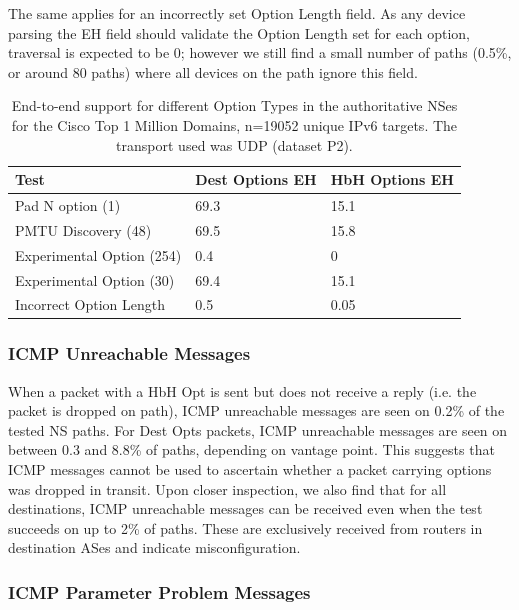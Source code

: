 \documentclass[conference]{IEEEtran}
\begin{document}
The same applies for an incorrectly set Option Length field. As any device parsing the EH field should validate the Option Length set for each option, traversal is expected to be 0; however we still find a small number of paths (0.5\%, or around 80 paths) where all devices on the path ignore this field.

\begin{table}
\begin{tabular}{l|l|l}
Test                      & Dest Options EH & HbH Options EH \\
\hline
Pad N option (1)          & 69.3           & 15.1          \\
PMTU Discovery (48)       & 69.5           & 15.8          \\
Experimental Option (254) & 0.4            & 0             \\
Experimental Option (30)  & 69.4           & 15.1          \\
Incorrect Option Length   & 0.5            & 0.05            
\end{tabular}
\label{tbl:option_type_support}
\caption{End-to-end support for different Option Types in the authoritative NSes for the Cisco Top 1 Million Domains, n=19052 unique IPv6 targets. The transport used was UDP (dataset P2).}
\end{table}

\subsubsection{ICMP Unreachable Messages}

When a packet with a HbH Opt is sent but does not receive a reply (i.e. the packet is dropped on path),  ICMP unreachable messages are seen on 0.2\% of the tested NS paths. For Dest Opts packets, ICMP unreachable messages are seen on between 0.3 and 8.8\% of paths, depending on vantage point.
This suggests that ICMP messages cannot be used to ascertain whether a packet carrying options was dropped in transit.
Upon closer inspection, we also find that for all destinations, ICMP unreachable messages can be received even when the test succeeds on up to 2\% of paths. These are exclusively received from routers in destination ASes and indicate misconfiguration.


\subsubsection{ICMP Parameter Problem Messages}
\end{document}
